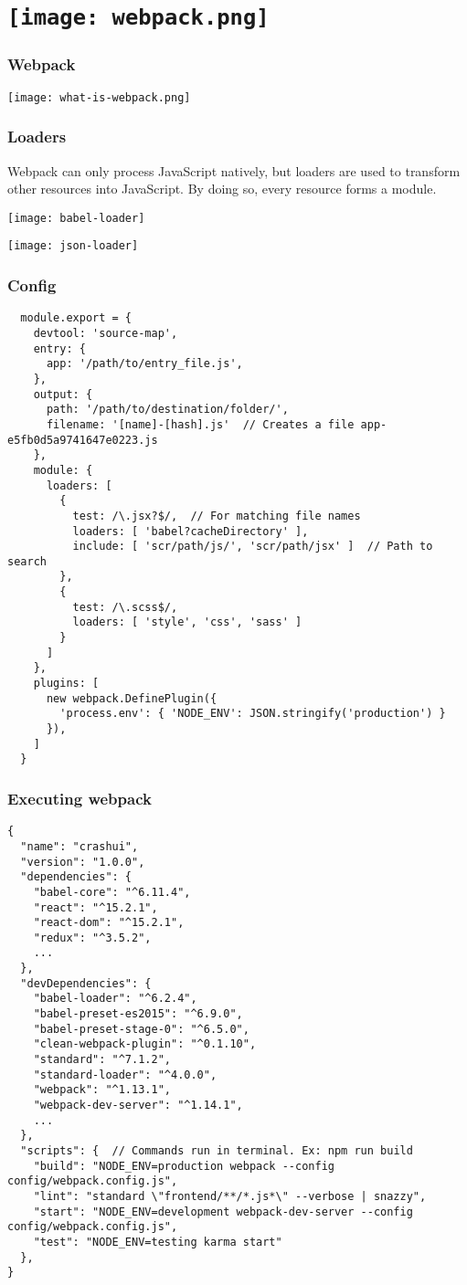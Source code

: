 \section{\texorpdfstring{\texttt{[image: webpack.png]}}{Webpack}}

\begin{frame}
  \frametitle{Webpack}
  \texttt{[image: what-is-webpack.png]}
\end{frame}

\begin{frame}
  \frametitle{Loaders}
  Webpack can only process JavaScript natively, but loaders are used to transform other resources into JavaScript. By doing so, every resource forms a module.

  \texttt{[image: babel-loader]}

  \texttt{[image: json-loader]}
\end{frame}

\begin{frame}[fragile]
  \frametitle{Config}
  \begin{verbatim}
  module.export = {
    devtool: 'source-map',
    entry: {
      app: '/path/to/entry_file.js',
    },
    output: {
      path: '/path/to/destination/folder/',
      filename: '[name]-[hash].js'  // Creates a file app-e5fb0d5a9741647e0223.js
    },
    module: {
      loaders: [
        {
          test: /\.jsx?$/,  // For matching file names
          loaders: [ 'babel?cacheDirectory' ],
          include: [ 'scr/path/js/', 'scr/path/jsx' ]  // Path to search
        },
        {
          test: /\.scss$/,
          loaders: [ 'style', 'css', 'sass' ]
        }
      ]
    },
    plugins: [
      new webpack.DefinePlugin({
        'process.env': { 'NODE_ENV': JSON.stringify('production') }
      }),
    ]
  }
  \end{verbatim}
\end{frame}

\begin{frame}[fragile]
  \frametitle{Executing webpack}
  \begin{verbatim}
{
  "name": "crashui",
  "version": "1.0.0",
  "dependencies": {
    "babel-core": "^6.11.4",
    "react": "^15.2.1",
    "react-dom": "^15.2.1",
    "redux": "^3.5.2",
    ...
  },
  "devDependencies": {
    "babel-loader": "^6.2.4",
    "babel-preset-es2015": "^6.9.0",
    "babel-preset-stage-0": "^6.5.0",
    "clean-webpack-plugin": "^0.1.10",
    "standard": "^7.1.2",
    "standard-loader": "^4.0.0",
    "webpack": "^1.13.1",
    "webpack-dev-server": "^1.14.1",
    ...
  },
  "scripts": {  // Commands run in terminal. Ex: npm run build
    "build": "NODE_ENV=production webpack --config config/webpack.config.js",
    "lint": "standard \"frontend/**/*.js*\" --verbose | snazzy",
    "start": "NODE_ENV=development webpack-dev-server --config config/webpack.config.js",
    "test": "NODE_ENV=testing karma start"
  },
}
  \end{verbatim}
\end{frame}
